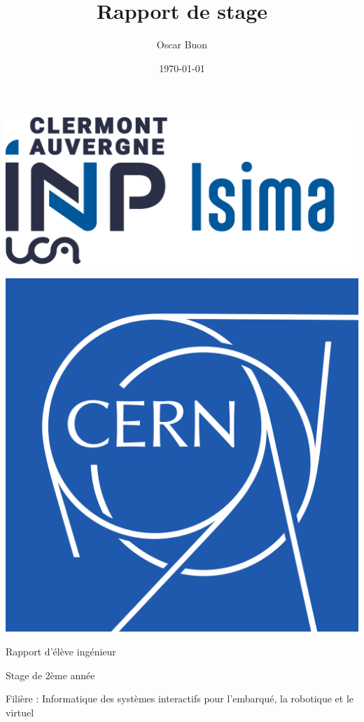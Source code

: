 \documentclass[a4paper,12pt]{report}
\title{Rapport de stage}
\author{Oscar Buon}
\date{\today}
\begin{document}
\begin{titlepage}
    \centering
    \begin{minipage}{0.45\textwidth}
        \includegraphics[width=\textwidth]{logo_ISIMA_INP.png}
    \end{minipage}\hfill
    \begin{minipage}{0.45\textwidth}
        \includegraphics[width=\textwidth]{logo_CERN.png}
    \end{minipage}

    \vfill

	{\Large
        Rapport d'élève ingénieur \par
        Stage de 2ème année \par
        Filière : Informatique des systèmes interactifs pour l’embarqué, la robotique et le virtuel \par
    }


\end{titlepage}
\end{document}
